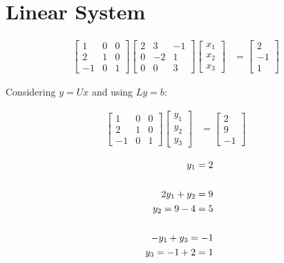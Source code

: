 \section{Linear System}
		
	\begin{align}
		\begin{bmatrix}
			1 & 0 & 0 \\[0.3em]
			2 & 1 & 0 \\[0.3em]
			-1 & 0 & 1
		\end{bmatrix}
		\begin{bmatrix}
			2 & 3 & -1 \\[0.3em]
			0 & -2 & 1 \\[0.3em]
			0 & 0 & 3
		\end{bmatrix}
		\begin{bmatrix}
			x_{1} \\[0.3em]
			x_{2} \\[0.3em]
			x_{3}
		\end{bmatrix}&= \begin{bmatrix}
			2 \\[0.3em]
			-1 \\[0.3em]
			1
		\end{bmatrix}&
	\label{eq:63}
	\end{align}

	Considering $y = Ux$ and using $Ly = b$:

	\begin{align}
		\begin{bmatrix}
			1 & 0 & 0 \\[0.3em]
			2 & 1 & 0 \\[0.3em]
			-1 & 0 & 1
		\end{bmatrix}
		\begin{bmatrix}
			y_{1} \\[0.3em]
			y_{2} \\[0.3em]
			y_{3}
		\end{bmatrix}&= \begin{bmatrix}
			2 \\[0.3em]
			9 \\[0.3em]
			-1
		\end{bmatrix}&
	\label{eq:63y}
	\end{align}

	\begin{align}
		y_{1} = 2 \\
		\notag \\
		2y_{1} + y_{2} = 9 \notag \\
		y_{2} = 9 - 4 = 5 \\
		\notag \\
		-y_{1} + y_{3} = -1 \notag \\
		y_{3} = -1 + 2 = 1
	\end{align}

